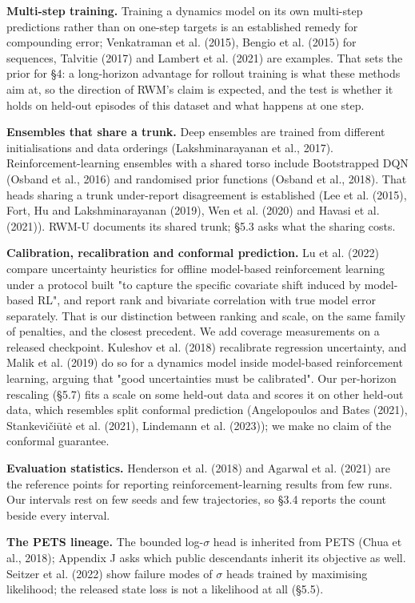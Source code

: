 \documentclass[10pt]{article}
\begin{document}
\textbf{Multi-step training.} Training a dynamics model on its own multi-step predictions rather than on one-step targets is an established remedy for compounding error; Venkatraman et al. (2015), Bengio et al. (2015) for sequences, Talvitie (2017) and Lambert et al. (2021) are examples. That sets the prior for \S{}4: a long-horizon advantage for rollout training is what these methods aim at, so the direction of RWM's claim is expected, and the test is whether it holds on held-out episodes of this dataset and what happens at one step.

\textbf{Ensembles that share a trunk.} Deep ensembles are trained from different initialisations and data orderings (Lakshminarayanan et al., 2017). Reinforcement-learning ensembles with a shared torso include Bootstrapped DQN (Osband et al., 2016) and randomised prior functions (Osband et al., 2018). That heads sharing a trunk under-report disagreement is established (Lee et al. (2015), Fort, Hu and Lakshminarayanan (2019), Wen et al. (2020) and Havasi et al. (2021)). RWM-U documents its shared trunk; \S{}5.3 asks what the sharing costs.

\textbf{Calibration, recalibration and conformal prediction.} Lu et al. (2022) compare uncertainty heuristics for offline model-based reinforcement learning under a protocol built "to capture the specific covariate shift induced by model-based RL", and report rank and bivariate correlation with true model error separately. That is our distinction between ranking and scale, on the same family of penalties, and the closest precedent. We add coverage measurements on a released checkpoint. Kuleshov et al. (2018) recalibrate regression uncertainty, and Malik et al. (2019) do so for a dynamics model inside model-based reinforcement learning, arguing that "good uncertainties must be calibrated". Our per-horizon rescaling (\S{}5.7) fits a scale on some held-out data and scores it on other held-out data, which resembles split conformal prediction (Angelopoulos and Bates (2021), Stankevičiūtė et al. (2021), Lindemann et al. (2023)); we make no claim of the conformal guarantee.

\textbf{Evaluation statistics.} Henderson et al. (2018) and Agarwal et al. (2021) are the reference points for reporting reinforcement-learning results from few runs. Our intervals rest on few seeds and few trajectories, so \S{}3.4 reports the count beside every interval.

\textbf{The PETS lineage.} The bounded log-$\sigma$ head is inherited from PETS (Chua et al., 2018); Appendix J asks which public descendants inherit its objective as well. Seitzer et al. (2022) show failure modes of $\sigma$ heads trained by maximising likelihood; the released state loss is not a likelihood at all (\S{}5.5).
\end{document}
